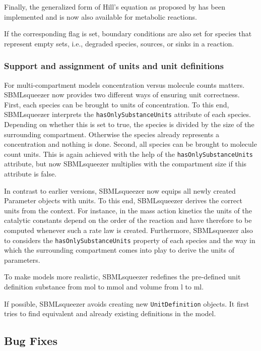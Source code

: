 Finally, the generalized form of Hill's equation as proposed by \citet[in
``Fundamentals of Enzyme Kinetics'', p. 314]{Cornish-Bowden2004} has been
implemented and is now also available for metabolic reactions.

If the corresponding flag is set, boundary conditions are also set for species
that represent empty sets, i.e., degraded species, sources, or sinks in a
reaction.


\subsubsection{Support and assignment of units and unit definitions}

For multi-compartment models concentration versus molecule counts matters.
SBMLsqueezer now provides two different ways of ensuring unit correctness.
First, each species can be brought to units of concentration. To this end,
SBMLsqueezer interprets the \texttt{hasOnlySubstanceUnits} attribute of each species.
Depending on whether this is set to true, the species is divided by the size of
the surrounding compartment. Otherwise the species already represents a
concentration and nothing is done. Second, all species can be brought to
molecule count units. This is again achieved with the help of the
\texttt{hasOnlySubstanceUnits} attribute, but now SBMLsqueezer multiplies with the
compartment size if this attribute is false.

In contrast to earlier versions, SBMLsqueezer now equips all newly created
Parameter objects with units. To this end, SBMLsqueezer derives the correct
units from the context. For instance, in the mass action kinetics the units of
the catalytic constants depend on the order of the reaction and have therefore
to be computed whenever such a rate law is created. Furthermore, SBMLsqueezer
also to considers the \texttt{hasOnlySubstanceUnits} property of each species and the way
in which the surrounding compartment comes into play to derive the units of
parameters.

To make models more realistic, SBMLsqueezer redefines the pre-defined \SBML unit
definition substance from mol to mmol and volume from l to ml.

If possible, SBMLsqueezer avoids creating new \texttt{UnitDefinition} objects. It first
tries to find equivalent and already existing definitions in the model.

\subsection{Bug Fixes}

